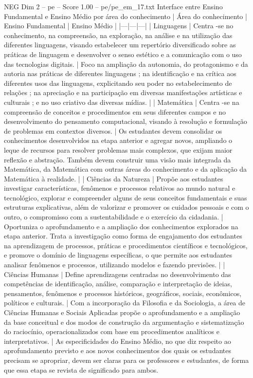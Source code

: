 \begin{textsample}{NEG Dim 2 – pe – Score 1.00 – pe/pe\_em\_17.txt}  \label{ex:f2_neg_038}
Interface entre Ensino Fundamental e Ensino Médio por área do conhecimento | Área do conhecimento | Ensino Fundamental | Ensino Médio | |---|---|---| | Linguagens | Centra -se no conhecimento, na compreensão, na exploração, na análise e na utilização das diferentes linguagens, visando estabelecer um repertório diversificado sobre as práticas de linguagem e desenvolver o senso estético e a comunicação com o uso das tecnologias digitais. | Foco na ampliação da autonomia, do protagonismo e da autoria nas práticas de diferentes linguagens ; na identificação e na crítica aos diferentes usos das linguagens, explicitando seu poder no estabelecimento de relações ; na apreciação e na participação em diversas manifestações artísticas e culturais ; e no uso criativo das diversas mídias. | | Matemática | Centra -se na compreensão de conceitos e procedimentos em seus diferentes campos e no desenvolvimento do pensamento computacional, visando à resolução e formulação de problemas em contextos diversos. | Os estudantes devem consolidar os conhecimentos desenvolvidos na etapa anterior e agregar novos, ampliando o leque de recursos para resolver problemas mais complexos, que exijam maior reflexão e abstração.
Também devem construir uma visão mais integrada da Matemática, da Matemática com outras áreas do conhecimento e da aplicação da Matemática à realidade. | | Ciências da Natureza | Propõe aos estudantes investigar características, fenômenos e processos relativos ao mundo natural e tecnológico, explorar e compreender alguns de seus conceitos fundamentais e suas estruturas explicativas, além de valorizar e promover os cuidados pessoais e com o outro, o compromisso com a sustentabilidade e o exercício da cidadania. | Oportuniza o aprofundamento e a ampliação dos conhecimentos explorados na etapa anterior.
Trata a investigação como forma de engajamento dos estudantes na aprendizagem de processos, práticas e procedimentos científicos e tecnológicos, e promove o domínio de linguagens específicas, o que permite aos estudantes analisar fenômenos e processos, utilizando modelos e fazendo previsões. | | Ciências Humanas | Define aprendizagens centradas no desenvolvimento das competências de identificação, análise, comparação e interpretação de ideias, pensamentos, fenômenos e processos históricos, geográficos, sociais, econômicos, políticos e culturais. | Com a incorporação da Filosofia e da Sociologia, a área de Ciências Humanas e Sociais Aplicadas propõe o aprofundamento e a ampliação da base conceitual e dos modos de construção da argumentação e sistematização do raciocínio, operacionalizados com base em procedimentos analíticos e interpretativos. | As especificidades do Ensino Médio, no que diz respeito ao aprofundamento previsto e aos novos conhecimentos dos quais os estudantes precisam se apropriar, devem ser claras para os professores e estudantes, de forma que essa etapa se revista de significado para ambos.

\end{textsample}
